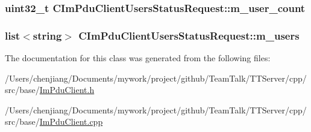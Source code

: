 \subsubsection[{m\+\_\+user\+\_\+count}]{\setlength{\rightskip}{0pt plus 5cm}uint32\+\_\+t C\+Im\+Pdu\+Client\+Users\+Status\+Request\+::m\+\_\+user\+\_\+count\hspace{0.3cm}{\ttfamily [private]}}\label{class_c_im_pdu_client_users_status_request_a4b22d5d63ed68c2cb9e8b35e437a5348}
\hypertarget{class_c_im_pdu_client_users_status_request_a75851c22de48ebce1e159b5b1d2dcb86}{}
\subsubsection[{m\+\_\+users}]{\setlength{\rightskip}{0pt plus 5cm}list$<$string$>$ C\+Im\+Pdu\+Client\+Users\+Status\+Request\+::m\+\_\+users\hspace{0.3cm}{\ttfamily [private]}}\label{class_c_im_pdu_client_users_status_request_a75851c22de48ebce1e159b5b1d2dcb86}


The documentation for this class was generated from the following files\+:\begin{DoxyCompactItemize}
\item 
/\+Users/chenjiang/\+Documents/mywork/project/github/\+Team\+Talk/\+T\+T\+Server/cpp/src/base/\hyperlink{_im_pdu_client_8h}{Im\+Pdu\+Client.\+h}\item 
/\+Users/chenjiang/\+Documents/mywork/project/github/\+Team\+Talk/\+T\+T\+Server/cpp/src/base/\hyperlink{_im_pdu_client_8cpp}{Im\+Pdu\+Client.\+cpp}\end{DoxyCompactItemize}

